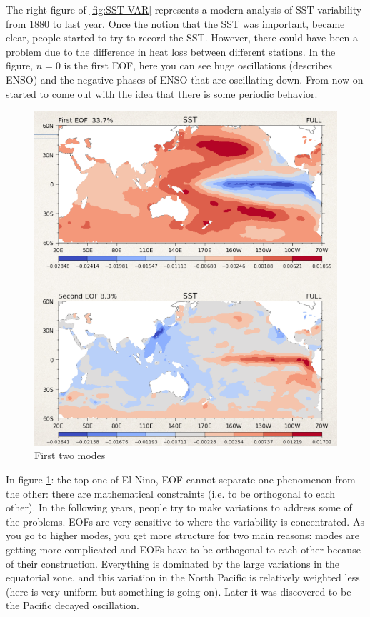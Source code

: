 The right figure of \ref{fig:SST VAR} represents a modern analysis of SST variability from 1880 to last year. Once the notion that the SST was important, became clear, people started to try to record the SST. However, there could have been a problem due to the difference in heat loss between different stations. In the figure, $n=0$ is the first EOF, here you can see huge oscillations (describes ENSO) and the negative phases of ENSO that are oscillating down. From now on started to come out with the idea that there is some periodic behavior.
\begin{figure}[htpb]
	\centering
	\includegraphics[width=0.35\linewidth]{uploads/Screenshot 2024-11-18 164916.png}
	\caption{First two modes}
	\label{fig:first two modes}
\end{figure}
In figure \ref{fig:first two modes}: the top one of El Nino, EOF cannot separate one phenomenon from the other: there are mathematical constraints (i.e. to be orthogonal to each other). In the following  years, people try to make variations to address some of the problems. EOFs are very sensitive to where the variability is concentrated. As you go to higher modes, you get more structure for two main reasons: modes are getting more complicated and EOFs have to be orthogonal to each other because of their construction. Everything is dominated by the large variations in the equatorial zone, and this variation in the North Pacific is relatively weighted less (here is very uniform but something is going on). Later it was discovered to be the Pacific decayed oscillation.

